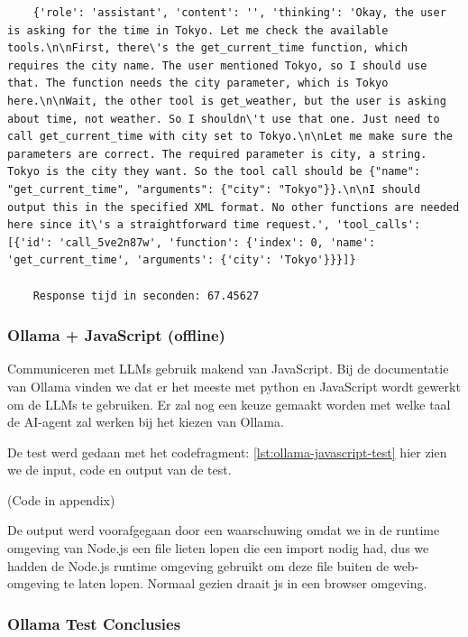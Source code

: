 \begin{verbatim}
    {'role': 'assistant', 'content': '', 'thinking': 'Okay, the user is asking for the time in Tokyo. Let me check the available tools.\n\nFirst, there\'s the get_current_time function, which requires the city name. The user mentioned Tokyo, so I should use that. The function needs the city parameter, which is Tokyo here.\n\nWait, the other tool is get_weather, but the user is asking about time, not weather. So I shouldn\'t use that one. Just need to call get_current_time with city set to Tokyo.\n\nLet me make sure the parameters are correct. The required parameter is city, a string. Tokyo is the city they want. So the tool call should be {"name": "get_current_time", "arguments": {"city": "Tokyo"}}.\n\nI should output this in the specified XML format. No other functions are needed here since it\'s a straightforward time request.', 'tool_calls': [{'id': 'call_5ve2n87w', 'function': {'index': 0, 'name': 'get_current_time', 'arguments': {'city': 'Tokyo'}}}]}
    
    Response tijd in seconden: 67.45627 
\end{verbatim}

\subsubsection{Ollama + JavaScript (offline)}
\label{sssec:ollamaplusjavascript}

Communiceren met LLMs gebruik makend van JavaScript. Bij de documentatie van Ollama vinden we dat er het meeste met python en JavaScript wordt gewerkt om de LLMs te gebruiken. Er zal nog een keuze gemaakt worden met welke taal de AI-agent zal werken bij het kiezen van Ollama.

De test werd gedaan met het codefragment: \ref{lst:ollama-javascript-test} hier zien we de input, code en output van de test.

(Code in appendix)

De output werd voorafgegaan door een waarschuwing omdat we in de runtime omgeving van Node.js een file lieten lopen die een import nodig had, dus we hadden de Node.js runtime omgeving gebruikt om deze file buiten de web-omgeving te laten lopen. Normaal gezien draait js in een browser omgeving.

\subsubsection{Ollama Test Conclusies}
\label{sssec:ollamatestconclusies}

